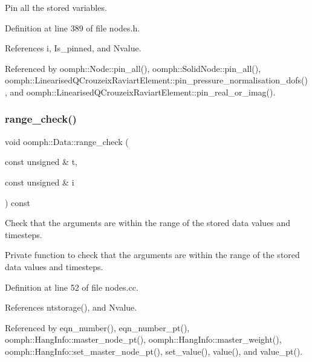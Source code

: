 Pin all the stored variables. 



Definition at line 389 of file nodes.\+h.



References i, Is\+\_\+pinned, and Nvalue.



Referenced by oomph\+::\+Node\+::pin\+\_\+all(), oomph\+::\+Solid\+Node\+::pin\+\_\+all(), oomph\+::\+Linearised\+Q\+Crouzeix\+Raviart\+Element\+::pin\+\_\+pressure\+\_\+normalisation\+\_\+dofs(), and oomph\+::\+Linearised\+Q\+Crouzeix\+Raviart\+Element\+::pin\+\_\+real\+\_\+or\+\_\+imag().

\mbox{\label{classoomph_1_1Data_a3fcd8a39ef027a9329b8e71439cf11bc}} 
\subsubsection{\texorpdfstring{range\+\_\+check()}{range\_check()}}
{\footnotesize\ttfamily void oomph\+::\+Data\+::range\+\_\+check (\begin{DoxyParamCaption}\item[{const unsigned \&}]{t,  }\item[{const unsigned \&}]{i }\end{DoxyParamCaption}) const\hspace{0.3cm}{\ttfamily [private]}}



Check that the arguments are within the range of the stored data values and timesteps. 

Private function to check that the arguments are within the range of the stored data values and timesteps. 

Definition at line 52 of file nodes.\+cc.



References ntstorage(), and Nvalue.



Referenced by eqn\+\_\+number(), eqn\+\_\+number\+\_\+pt(), oomph\+::\+Hang\+Info\+::master\+\_\+node\+\_\+pt(), oomph\+::\+Hang\+Info\+::master\+\_\+weight(), oomph\+::\+Hang\+Info\+::set\+\_\+master\+\_\+node\+\_\+pt(), set\+\_\+value(), value(), and value\+\_\+pt().

\mbox{\label{classoomph_1_1Data_ad520cff679734b7654b1638ada2c728a}} 
